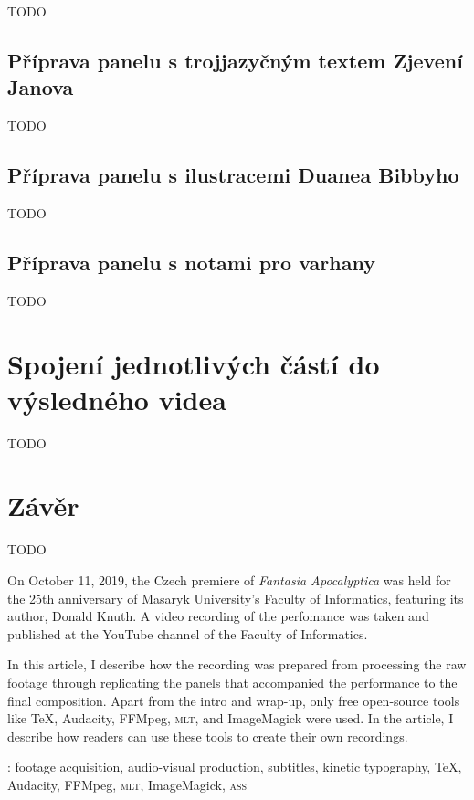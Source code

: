 \documentclass{csbulletin}
\newcommand\acro[1]{\textsc{\MakeLowercase{#1}}}
\begin{document}
TODO

\subsection{Příprava panelu s trojjazyčným textem Zjevení Janova}

TODO

\subsection{Příprava panelu s ilustracemi Duanea Bibbyho}

TODO

\subsection{Příprava panelu s notami pro varhany}

TODO

\section{Spojení jednotlivých částí do výsledného videa}
\label{sec:spojeni}

TODO

\section{Závěr}
\label{sec:zaver}

TODO

\printbibliography

\begin{summary}
On October 11, 2019, the Czech premiere of \emph{Fantasia Apocalyptica} was held for the 25th anniversary of Masaryk University's Faculty of Informatics, featuring its author, Donald Knuth. A video recording of the perfomance was taken and published at the YouTube channel of the Faculty of Informatics.

In this article, I describe how the recording was prepared from processing the raw footage through replicating the panels that accompanied the performance to the final composition. Apart from the intro and wrap-up, only free open-source tools like \TeX, Audacity, FFMpeg, \acro{MLT}, and ImageMagick were used. In the article, I describe how readers can use these tools to create their own recordings.

\keywords: footage acquisition, audio-visual production, subtitles, kinetic typography, \TeX, Audacity, FFMpeg, \acro{MLT}, ImageMagick, \acro{ASS}
\end{summary}
\end{document}
